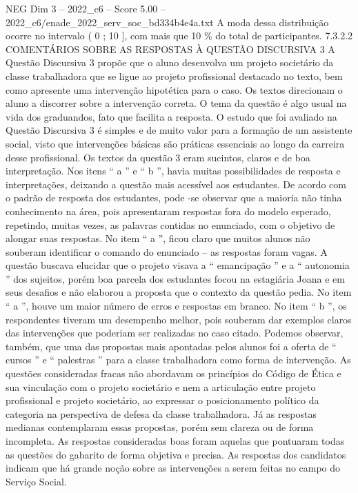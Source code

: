 \begin{textsample}{NEG Dim 3 – 2022\_c6 – Score 5.00 – 2022\_c6/enade\_2022\_serv\_soc\_bd334b4e4a.txt}
A moda dessa distribuição ocorre no intervalo ( 0 ; 10 ], com mais que 10 \% do total de participantes. 7.3.2.2 COMENTÁRIOS SOBRE AS RESPOSTAS À QUESTÃO DISCURSIVA 3 A Questão Discursiva 3 propõe que o aluno desenvolva um projeto societário da classe trabalhadora que se ligue ao projeto profissional destacado no texto, bem como apresente uma intervenção hipotética para o caso.
Os textos direcionam o aluno a discorrer sobre a intervenção correta.
O tema da questão é algo usual na vida dos graduandos, fato que facilita a resposta.
O estudo que foi avaliado na Questão Discursiva 3 é simples e de muito valor para a formação de um assistente social, visto que intervenções básicas são práticas essenciais ao longo da carreira desse profissional.
Os textos da questão 3 eram sucintos, claros e de boa interpretação.
Nos itens “ a ” e “ b ”, havia muitas possibilidades de resposta e interpretações, deixando a questão mais acessível aos estudantes.
De acordo com o padrão de resposta dos estudantes, pode -se observar que a maioria não tinha conhecimento na área, pois apresentaram respostas fora do modelo esperado, repetindo, muitas vezes, as palavras contidas no enunciado, com o objetivo de alongar suas respostas.
No item “ a ”, ficou claro que muitos alunos não souberam identificar o comando do enunciado – as respostas foram vagas.
A questão buscava elucidar que o projeto visava a “ emancipação ” e a “ autonomia ” dos sujeitos, porém boa parcela dos estudantes focou na estagiária Joana e em seus desafios e não elaborou a proposta que o contexto da questão pedia.
No item “ a ”, houve um maior número de erros e respostas em branco.
No item “ b ”, os respondentes tiveram um desempenho melhor, pois souberam dar exemplos claros das intervenções que poderiam ser realizadas no caso citado.
Podemos observar, também, que uma das propostas mais apontadas pelos alunos foi a oferta de “ cursos ” e “ palestras ” para a classe trabalhadora como forma de intervenção.
As questões consideradas fracas não abordavam os princípios do Código de Ética e sua vinculação com o projeto societário e nem a articulação entre projeto profissional e projeto societário, ao expressar o posicionamento político da categoria na perspectiva de defesa da classe trabalhadora.
Já as respostas medianas contemplaram essas propostas, porém sem clareza ou de forma incompleta.
As respostas consideradas boas foram aquelas que pontuaram todas as questões do gabarito de forma objetiva e precisa.
As respostas dos candidatos indicam que há grande noção sobre as intervenções a serem feitas no campo do Serviço Social.

\end{textsample}
